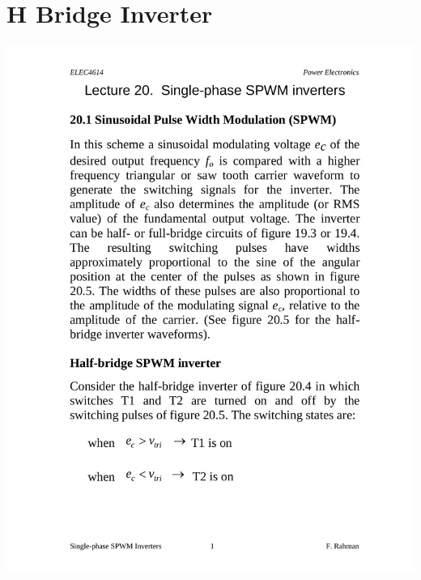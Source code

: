 \section{H Bridge Inverter}

\begin{center}

    \includegraphics[page=6,
                 clip, 
                 trim=4.5cm 15.5cm 5cm 7cm]{3/figures/fullBridge.pdf}
\end{center}






